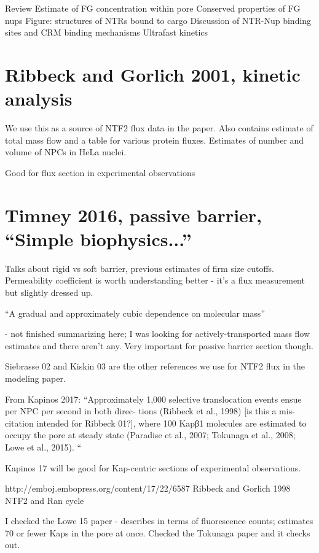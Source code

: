 Review
Estimate of FG concentration within pore
Conserved properties of FG nups
Figure: structures of NTRs bound to cargo
Discussion of NTR-Nup binding sites and CRM binding mechanisms
Ultrafast kinetics

\section{Ribbeck and Gorlich 2001, kinetic analysis}

We use this as a source of NTF2 flux data in the paper.  Also contains estimate of total mass flow and a table for various protein fluxes.  Estimates of number and volume of NPCs in HeLa nuclei.

Good for flux section in experimental observations

\section{Timney 2016, passive barrier, ``Simple biophysics...''}

Talks about rigid vs soft barrier, previous estimates of firm size cutoffs.
Permeability coefficient is worth understanding better - it's a flux measurement but slightly dressed up.

``A gradual and approximately cubic dependence on molecular mass''

- not finished summarizing here; I was looking for actively-transported mass flow estimates and there aren't any.  Very important for passive barrier section though.

Siebrasse 02 and Kiskin 03 are the other references we use for NTF2 flux in the modeling paper.

From Kapinos 2017: ``Approximately 1,000 selective translocation events ensue per NPC per second in both direc- tions (Ribbeck et al., 1998) [is this a mis-citation intended for Ribbeck 01?], where 100 Kapβ1 molecules are estimated to occupy the pore at steady state (Paradise et al., 2007; Tokunaga et al., 2008; Lowe et al., 2015). ``

Kapinos 17 will be good for Kap-centric sections of experimental observations.

http://emboj.embopress.org/content/17/22/6587 Ribbeck and Gorlich 1998 NTF2 and Ran cycle

I checked the Lowe 15 paper - describes in terms of fluorescence counts; estimates 70 or fewer Kaps in the pore at once.  Checked the Tokunaga paper and it checks out.  

